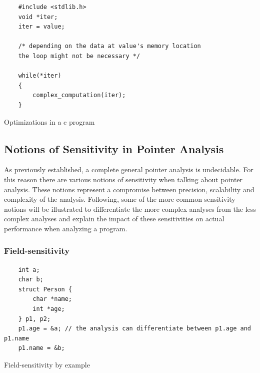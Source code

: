 \begin{listing}
    \begin{verbatim}
    #include <stdlib.h>
    void *iter;
    iter = value;

    /* depending on the data at value's memory location 
    the loop might not be necessary */
    
    while(*iter)
    {
        complex_computation(iter);
    }
    \end{verbatim}
    \caption{Optimizations in a c program}
    \label{lst:dataflow}
\end{listing}

\subsection{Notions of Sensitivity in Pointer Analysis}
As previously established, a complete general pointer analysis is undecidable.
For this reason there are various notions of sensitivity when talking about pointer analysis.
These notions represent a compromise between precision, scalability and complexity of the analysis.
Following, some of the more common sensitivity notions will be illustrated to differentiate the more complex analyses from the less complex analyses and explain the impact of these sensitivities on actual performance when analyzing a program.

\subsubsection{Field-sensitivity}

\begin{listing}
    \begin{verbatim}
    int a;
    char b;
    struct Person {
        char *name;
        int *age;
    } p1, p2;
    p1.age = &a; // the analysis can differentiate between p1.age and p1.name
    p1.name = &b;
        \end{verbatim}
    \caption{Field-sensitivity by example}
    \label{lst:field}
\end{listing}

